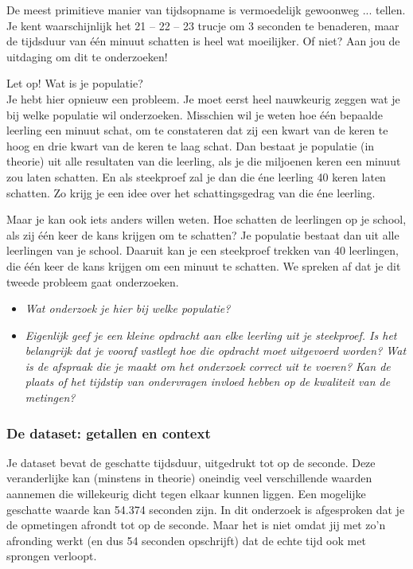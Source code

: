 \documentclass[11pt]{article}
\newcommand{\vraag}[2]{\begin{itemize}\item {\it #1} \vspace*{#2}\end{itemize}}
\begin{document}
De meest primitieve manier van tijdsopname is vermoedelijk gewoonweg ... tellen. Je kent
waarschijnlijk het 21 – 22 – 23 trucje om 3 seconden te benaderen, maar de tijdsduur van één minuut
schatten is heel wat moeilijker. Of niet? Aan jou de uitdaging om dit te onderzoeken!

Let op! Wat is je populatie?\\
Je hebt hier opnieuw een probleem. Je moet eerst heel nauwkeurig zeggen wat je bij welke populatie
wil onderzoeken. Misschien wil je weten hoe één bepaalde leerling een minuut schat, om te
constateren dat zij een kwart van de keren te hoog en drie kwart van de keren te laag schat. Dan
bestaat je populatie (in theorie) uit alle resultaten van die leerling, als je die miljoenen keren een
minuut zou laten schatten. En als steekproef zal je dan die éne leerling 40
keren laten schatten. Zo krijg je een idee over het schattingsgedrag van die
éne leerling.

Maar je kan ook iets anders willen weten. Hoe schatten de leerlingen op je
school, als zij één keer de kans krijgen om te schatten? Je populatie bestaat
dan uit alle leerlingen van je school. Daaruit kan je een steekproef trekken
van 40 leerlingen, die één keer de kans krijgen om een minuut te schatten.
We spreken af dat je dit tweede probleem gaat onderzoeken.

\vraag{Wat onderzoek je hier bij welke populatie?}{4cm}

\vraag{Eigenlijk geef je een kleine opdracht aan elke leerling uit je steekproef. Is het belangrijk dat
je vooraf vastlegt hoe die opdracht moet uitgevoerd worden? Wat is de afspraak die je maakt
om het onderzoek correct uit te voeren? Kan de plaats of het tijdstip van ondervragen
invloed hebben op de kwaliteit van de metingen?}{4cm}

\subsubsection{De dataset: getallen en context}

Je dataset bevat de geschatte tijdsduur, uitgedrukt tot op de seconde. Deze veranderlijke kan
(minstens in theorie) oneindig veel verschillende waarden aannemen die willekeurig dicht tegen
elkaar kunnen liggen. Een mogelijke geschatte waarde kan 54.374 seconden zijn. In dit onderzoek is
afgesproken dat je de opmetingen afrondt tot op de seconde. Maar het is niet omdat jij met zo’n
afronding werkt (en dus 54 seconden opschrijft) dat de echte tijd ook met sprongen verloopt.
\end{document}
